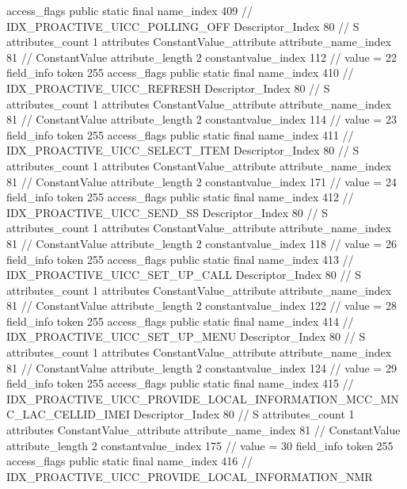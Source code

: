 {{{{{				access_flags	public static final
				name_index	409		// IDX_PROACTIVE_UICC_POLLING_OFF
				Descriptor_Index	80		// S
				attributes_count	1
				attributes {
				ConstantValue_attribute {
					attribute_name_index	81		// ConstantValue
					attribute_length	2
					constantvalue_index	112		// value = 22
				}
				}
			}
			field_info {
				token	255
				access_flags	public static final
				name_index	410		// IDX_PROACTIVE_UICC_REFRESH
				Descriptor_Index	80		// S
				attributes_count	1
				attributes {
				ConstantValue_attribute {
					attribute_name_index	81		// ConstantValue
					attribute_length	2
					constantvalue_index	114		// value = 23
				}
				}
			}
			field_info {
				token	255
				access_flags	public static final
				name_index	411		// IDX_PROACTIVE_UICC_SELECT_ITEM
				Descriptor_Index	80		// S
				attributes_count	1
				attributes {
				ConstantValue_attribute {
					attribute_name_index	81		// ConstantValue
					attribute_length	2
					constantvalue_index	171		// value = 24
				}
				}
			}
			field_info {
				token	255
				access_flags	public static final
				name_index	412		// IDX_PROACTIVE_UICC_SEND_SS
				Descriptor_Index	80		// S
				attributes_count	1
				attributes {
				ConstantValue_attribute {
					attribute_name_index	81		// ConstantValue
					attribute_length	2
					constantvalue_index	118		// value = 26
				}
				}
			}
			field_info {
				token	255
				access_flags	public static final
				name_index	413		// IDX_PROACTIVE_UICC_SET_UP_CALL
				Descriptor_Index	80		// S
				attributes_count	1
				attributes {
				ConstantValue_attribute {
					attribute_name_index	81		// ConstantValue
					attribute_length	2
					constantvalue_index	122		// value = 28
				}
				}
			}
			field_info {
				token	255
				access_flags	public static final
				name_index	414		// IDX_PROACTIVE_UICC_SET_UP_MENU
				Descriptor_Index	80		// S
				attributes_count	1
				attributes {
				ConstantValue_attribute {
					attribute_name_index	81		// ConstantValue
					attribute_length	2
					constantvalue_index	124		// value = 29
				}
				}
			}
			field_info {
				token	255
				access_flags	public static final
				name_index	415		// IDX_PROACTIVE_UICC_PROVIDE_LOCAL_INFORMATION_MCC_MNC_LAC_CELLID_IMEI
				Descriptor_Index	80		// S
				attributes_count	1
				attributes {
				ConstantValue_attribute {
					attribute_name_index	81		// ConstantValue
					attribute_length	2
					constantvalue_index	175		// value = 30
				}
				}
			}
			field_info {
				token	255
				access_flags	public static final
				name_index	416		// IDX_PROACTIVE_UICC_PROVIDE_LOCAL_INFORMATION_NMR
}}}}}
